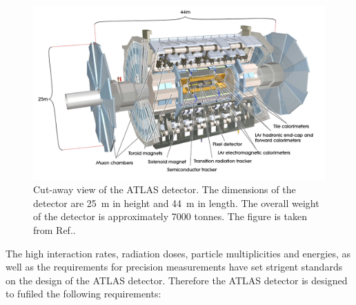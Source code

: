 \begin{figure}[bht]
\begin{centering}	
\includegraphics[width=1.0\textwidth]{Detector/plots/Cut-away-view-of-the-ATLAS-detector.png}
\caption{Cut-away view of the ATLAS detector. 
The dimensions of the detector are 25~m in
height and 44~m in length. The overall weight 
of the detector is approximately 7000 tonnes. The figure is taken from Ref.\cite{PERF-2007-01}.
	}
\label{fig:ATLAS_cut_away}
\end{centering}
\end{figure}

The high interaction rates, radiation doses, particle multiplicities 
and energies, as well as the requirements for precision measurements 
have set strigent standards on the design of the ATLAS detector. 
Therefore the ATLAS detector is designed to fufiled the following 
requirements:

